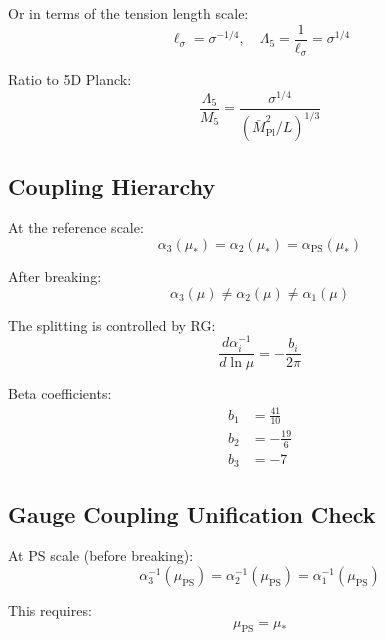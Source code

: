 \documentclass[11pt,a4paper]{article}
\theoremstyle{definition}
\begin{document}
Or in terms of the tension length scale:
\begin{equation}
\label{eq:ell-sigma-def}
\ell_\sigma = \sigma^{-1/4}, \quad \Lambda_5 = \frac{1}{\ell_\sigma} = \sigma^{1/4}
\end{equation}

Ratio to 5D Planck:
\begin{equation}
\label{eq:lambda5-m5-ratio}
\frac{\Lambda_5}{M_5} = \frac{\sigma^{1/4}}{(\bar{M}_{\text{Pl}}^2/L)^{1/3}}
\end{equation}

\subsection{Coupling Hierarchy}
\label{subsec:coupling-hierarchy}

At the reference scale:
\begin{equation}
\label{eq:alpha-hierarchy}
\alpha_3(\mu_*) = \alpha_2(\mu_*) = \alpha_{\text{PS}}(\mu_*)
\end{equation}

After breaking:
\begin{equation}
\label{eq:alpha-after-breaking}
\alpha_3(\mu) \neq \alpha_2(\mu) \neq \alpha_1(\mu)
\end{equation}

The splitting is controlled by RG:
\begin{equation}
\label{eq:alpha-splitting}
\frac{d\alpha_i^{-1}}{d\ln\mu} = -\frac{b_i}{2\pi}
\end{equation}

Beta coefficients:
\begin{align}
\label{eq:b1-value}
b_1 &= \frac{41}{10} \\
\label{eq:b2-value}
b_2 &= -\frac{19}{6} \\
\label{eq:b3-value}
b_3 &= -7
\end{align}

\subsection{Gauge Coupling Unification Check}
\label{subsec:unification-check}

At PS scale (before breaking):
\begin{equation}
\label{eq:unification-at-ps}
\alpha_3^{-1}(\mu_{\text{PS}}) = \alpha_2^{-1}(\mu_{\text{PS}}) = \alpha_1^{-1}(\mu_{\text{PS}})
\end{equation}

This requires:
\begin{equation}
\label{eq:unification-condition}
\mu_{\text{PS}} = \mu_*
\end{equation}
\end{document}
